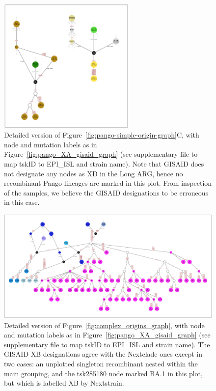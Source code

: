 \documentclass{article}
\begin{document}
\begin{figure} \centering
\includegraphics[width=0.6\textwidth]{figures/Pango_XD_gisaid_large_graph.pdf}
\caption{\label{fig:pango_XD_gisaid_graph}
Detailed version of Figure~\ref{fig:pango-simple-origin-graph}C, with node and mutation labels as in
Figure~\ref{fig:pango_XA_gisaid_graph} (see supplementary file \protect{}
to map tskID to EPI\_ISL and strain name).
Note that GISAID does not designate any nodes as XD in the Long ARG, hence no recombinant Pango lineages
are marked in this plot. From inspection of the samples, we believe the GISAID designations to be erroneous
in this case.
}
\end{figure}

\begin{figure} \centering
\includegraphics[width=\textwidth]{figures/Pango_XB_gisaid_large_graph.pdf}
\caption{\label{fig:pango_XB_gisaid_graph}
Detailed version of Figure~\ref{fig:complex_origins_graph}, with node and mutation labels as in
Figure~\ref{fig:pango_XA_gisaid_graph} (see supplementary file \protect{}
to map tskID to EPI\_ISL and strain name).
The GISAID XB designations agree with the Nextclade ones except in two cases: an unplotted
singleton recombinant nested within the main grouping, and the tsk285180 node marked BA.1 in this plot,
but which is labelled XB by Nextstrain.
}
\end{figure}
\end{document}
